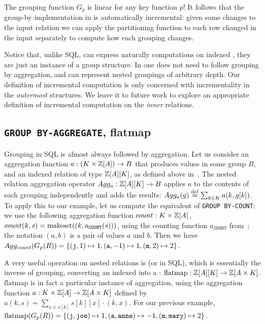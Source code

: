 The grouping function $G_p$ is linear for any key function $p$!
It follows that the group-by implementation in \dbsp is automatically
incremental: given some changes
to the input relation we can apply the partitioning function
to each row changed in the input separately to compute how each grouping changes.

Notice that, unlike SQL, \dbsp can express naturally computations
on indexed \zrs, they are just an instance of a group structure.
In \dbsp one does not need to follow
grouping by aggregation, and \dbsp can represent nested groupings
of arbitrary depth.  Our definition of incremental
computation is only concerned with incrementality in the
\emph{outermost} structures.  We leave it to future work to
explore an appropriate definition of incremental computation
on the \emph{inner} relations.


\subsection{\texttt{GROUP BY-AGGREGATE}, flatmap}

Grouping in SQL is almost always followed by aggregation.
Let us consider an aggregation function $a: (K \times \mathbb{Z}[A]) \to B$ that produces values
in some group $B$, and an indexed relation of type $\mathbb{Z}[A][K]$, as defined above in~.
The nested relation aggregation operator $Agg_a: \mathbb{Z}[A][K] \to B$ applies $a$
to the contents of each grouping independently and adds the results:
$Agg_a(g) \stackrel{\textrm{\scriptsize def}}{=} \sum_{k \in K} a(k, g[k])$.  To apply this
to our example, let us compute the equivalent of \texttt{GROUP BY-COUNT}; we use
the following aggregation function $count: K \times \mathbb{Z}[A]$, $count(k, s) =
\mbox{makeset}((k, a_\texttt{COUNT}(s)))$, using the \zr counting function $a_\texttt{COUNT}$
from~; the notation $(a,b)$ is a pair of values $a$ and $b$.
Then we have $Agg_{count} (G_p(R)) = \{ (\mbox{\texttt{j}}, 1) \mapsto 1,
(\mbox{\texttt{a}}, -1) \mapsto 1, (\mbox{\texttt{m}}, 2) \mapsto 2 \}$.


A very useful operation on nested relations is  (or  in SQL), which is
essentially the inverse of grouping, converting an indexed
\zr into a \zr: $\mbox{flatmap}: \mathbb{Z}[A][K] \to \mathbb{Z}[A \times K]$.
$\mbox{flatmap}$ is in fact a particular instance of aggregation,
using the aggregation function $a: K \times \mathbb{Z}[A] \to \mathbb{Z}[A \times K]$
defined by $a(k, s) = \sum_{x \in s[k]} s[k][x] \cdot (k, x).$
For our previous example, $\mbox{flatmap}(G_p(R)) = \{ (\mbox{\texttt{j}}, \mbox{\texttt{joe}}) \mapsto 1,
(\mbox{\texttt{a}}, \mbox{\texttt{anne}}) \mapsto -1, (\mbox{\texttt{m}}, \mbox{\texttt{mary}}) \mapsto 2 \}$.

